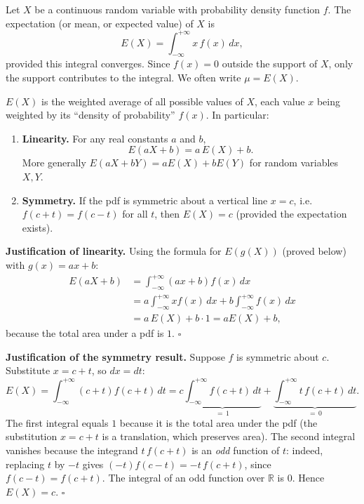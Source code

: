 \documentclass[11pt]{article}
\newcommand{\cle}[1]{{\popxbold\color{popdark}#1}}
\begin{document}
\begin{definition}
Let $X$ be a continuous random variable with probability density function $f$. The \cle{expectation} (or \cle{mean}, or \cle{expected value}) of $X$ is
\[
E(X) = \int_{-\infty}^{+\infty} x\, f(x)\, dx,
\]
provided this integral converges. Since $f(x)=0$ outside the support of $X$, only the support contributes to the integral. We often write $\mu = E(X)$.
\end{definition}

\begin{propriete}
$E(X)$ is the weighted average of all possible values of $X$, each value $x$ being weighted by its ``density of probability'' $f(x)$. In particular:
\begin{enumerate}
\item \textbf{Linearity.} For any real constants $a$ and $b$,
\[
E(aX+b) = a\,E(X) + b.
\]
More generally $E(aX+bY)=aE(X)+bE(Y)$ for random variables $X,Y$.
\item \textbf{Symmetry.} If the pdf is symmetric about a vertical line $x=c$, i.e. $f(c+t)=f(c-t)$ for all $t$, then $E(X)=c$ (provided the expectation exists).
\end{enumerate}
\end{propriete}

\textbf{Justification of linearity.} Using the formula for $E(g(X))$ (proved below) with $g(x)=ax+b$:
\begin{align*}
E(aX+b) &= \int_{-\infty}^{+\infty} (ax+b)f(x)\,dx \\
&= a\int_{-\infty}^{+\infty} x f(x)\,dx + b\int_{-\infty}^{+\infty} f(x)\,dx \\
&= a\,E(X) + b \cdot 1 = aE(X)+b,
\end{align*}
because the total area under a pdf is $1$. \hfill $\square$

\textbf{Justification of the symmetry result.} Suppose $f$ is symmetric about $c$. Substitute $x = c + t$, so $dx = dt$:
\[
E(X) = \int_{-\infty}^{+\infty}(c+t)f(c+t)\,dt = c\underbrace{\int_{-\infty}^{+\infty} f(c+t)\,dt}_{=\,1} + \underbrace{\int_{-\infty}^{+\infty} t\,f(c+t)\,dt}_{=\,0}.
\]
The first integral equals $1$ because it is the total area under the pdf (the substitution $x=c+t$ is a translation, which preserves area). The second integral vanishes because the integrand $t\,f(c+t)$ is an \emph{odd} function of $t$: indeed, replacing $t$ by $-t$ gives $(-t)f(c-t) = -t\,f(c+t)$, since $f(c-t)=f(c+t)$. The integral of an odd function over $\mathbb{R}$ is $0$. Hence $E(X)=c$. \hfill $\square$
\end{document}
